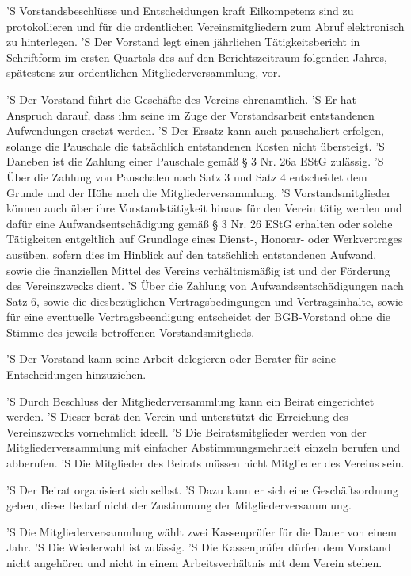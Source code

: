 \documentclass[a4paper,10pt]{scrreprt}
\begin{document}
\begin{contract}
'S Vorstandsbeschlüsse und Entscheidungen kraft Eilkompetenz sind zu
protokollieren und für die ordentlichen Vereinsmitgliedern zum Abruf
elektronisch zu hinterlegen.
'S Der Vorstand legt einen jährlichen Tätigkeitsbericht in Schriftform im
ersten Quartals des auf den Berichtszeitraum folgenden Jahres, spätestens zur
ordentlichen Mitgliederversammlung, vor.

'S Der Vorstand führt die Geschäfte des Vereins ehrenamtlich.
'S Er hat Anspruch darauf, dass ihm seine im Zuge der Vorstandsarbeit
entstandenen Aufwendungen ersetzt werden.
'S Der Ersatz kann auch pauschaliert erfolgen, solange die Pauschale die
tatsächlich entstandenen Kosten nicht übersteigt.
'S Daneben ist die Zahlung einer Pauschale gemäß § 3 Nr. 26a EStG zulässig.
'S Über die Zahlung von Pauschalen nach Satz 3 und Satz 4 entscheidet dem
Grunde und der Höhe nach die Mitgliederversammlung.
'S Vorstandsmitglieder können auch über ihre Vorstandstätigkeit hinaus für den
Verein tätig werden und dafür eine Aufwandsentschädigung gemäß § 3 Nr. 26 EStG
erhalten oder solche Tätigkeiten entgeltlich auf Grundlage eines Dienst-,
Honorar- oder Werkvertrages ausüben, sofern dies im Hinblick auf den tatsächlich
entstandenen Aufwand, sowie die finanziellen Mittel des Vereins verhältnismäßig
ist und der Förderung des Vereinszwecks dient.
'S Über die Zahlung von Aufwandsentschädigungen nach Satz 6, sowie die
diesbezüglichen Vertragsbedingungen und Vertragsinhalte, sowie für eine
eventuelle Vertragsbeendigung entscheidet der BGB-Vorstand ohne die Stimme
des jeweils betroffenen Vorstandsmitglieds.

'S Der Vorstand kann seine Arbeit delegieren oder Berater für seine
Entscheidungen hinzuziehen.


'S Durch Beschluss der Mitgliederversammlung kann ein Beirat eingerichtet
werden.
'S Dieser berät den Verein und unterstützt die Erreichung des Vereinszwecks
vornehmlich ideell.
'S Die Beiratsmitglieder werden von der Mitgliederversammlung mit einfacher
Abstimmungsmehrheit einzeln berufen und abberufen.
'S Die Mitglieder des Beirats müssen nicht Mitglieder des Vereins sein.

'S Der Beirat organisiert sich selbst.
'S Dazu kann er sich eine Geschäftsordnung geben, diese Bedarf nicht der
Zustimmung der Mitgliederversammlung.


'S Die Mitgliederversammlung wählt zwei Kassenprüfer für die Dauer von einem
Jahr.
'S Die Wiederwahl ist zulässig.
'S Die Kassenprüfer dürfen dem Vorstand nicht angehören und nicht in einem
Arbeitsverhältnis mit dem Verein stehen.


\end{contract}
\end{document}
